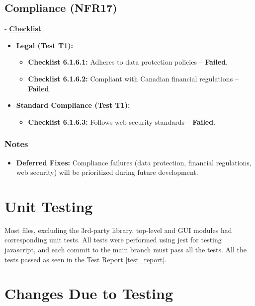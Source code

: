 \documentclass[12pt, titlepage]{article}
\begin{document}
\subsection{Compliance (NFR17)}  
- \textbf{\hyperlink{checklist-nfr17}{Checklist}}
\label{nfr17}

\begin{itemize}
    \item \textbf{Legal (Test T1):}  
    \begin{itemize}
        \item \textbf{Checklist 6.1.6.1:} Adheres to data protection policies – \textbf{Failed}.  
        \item \textbf{Checklist 6.1.6.2:} Compliant with Canadian financial regulations – \textbf{Failed}.  
    \end{itemize}
    
    \item \textbf{Standard Compliance (Test T1):}  
    \begin{itemize}
        \item \textbf{Checklist 6.1.6.3:} Follows web security standards – \textbf{Failed}.  
    \end{itemize}
\end{itemize}

\subsubsection*{Notes}  
\begin{itemize}
    \item \textbf{Deferred Fixes:} Compliance failures (data protection, financial regulations, web security) will be prioritized during future development.  
\end{itemize}

\section{Unit Testing}

Most files, excluding the 3rd-party library, top-level and GUI modules had corresponding unit tests.
All tests were performed using jest for testing javascript, and each commit to the main branch must pass all the tests.
All the tests passed as seen in the Test Report \ref{test_report}.

\section{Changes Due to Testing}
\end{document}

